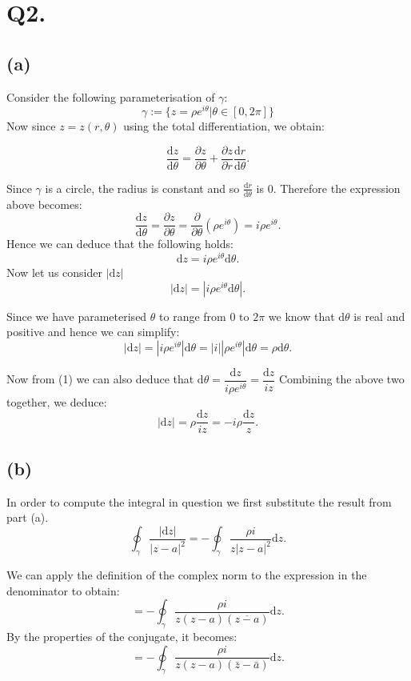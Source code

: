 \documentclass[12pt]{article}
\begin{document}
\section*{Q2.}
\subsection*{(a)}
Consider the following parameterisation of $\gamma$:
\[\gamma := \{ z=\rho e^{i\theta} | \theta \in [0, 2\pi] \}\]
Now since $ z = z(r, \theta) $ using the total differentiation, we obtain:

\[
	\frac{\text{d} z}{\text{d} \theta} = \frac{\partial z}{\partial \theta} + \frac{\partial z}{\partial r} \frac{\text{d} r}{\text{d} \theta}
.\]

Since $\gamma$ is a circle, the radius is constant and so $\frac{\text{d} r}{\text{d} \theta}$ is 0.
Therefore the expression above becomes:
\[
	\frac{\text{d} z}{\text{d} \theta} = \frac{\partial z}{\partial \theta}
	= \frac{\partial  }{\partial \theta} \left(\rho e^{i\theta}\right)
	= i\rho e^{i\theta}
.\]
Hence we can deduce that the following holds:
\begin{equation}
	\text{d}z = i\rho e^{i\theta} \text{d}\theta
.\end{equation}
Now let us consider $|\text{d}z|$
\[
	|\text{d}z| = |i\rho e^{i\theta} \text{d} \theta|
.\]

Since we have parameterised $\theta$ to range from $0 \text{ to } 2\pi$ we know that $\text{d} \theta$ is real and positive and hence we can simplify:
\[
|\text{d}z| = |i\rho e^{i\theta}|\text{d} \theta = |i| |\rho e^{i\theta}| \text{d}\theta = \rho \text{d}\theta
.\]

Now from (1) we can also deduce that $\text{d}\theta = \dfrac{\text{d}z}{i \rho e^{i\theta}} = \dfrac{\text{d}z}{iz}$
Combining the above two together, we deduce:
\[
|\text{d}z| = \rho \frac{\text{d}z}{iz} =  - i\rho \frac{\text{d}z}{z}
.\]

\subsection*{(b)}
In order to compute the integral in question we first substitute the result from part (a).
\[
	\oint_\gamma \frac{|\text{d}z|}{|z - a|^2} = - \oint_\gamma \frac{\rho i}{z |z - a|^2} \text{d} z
.\]

We can apply the definition of the complex norm to the expression in the denominator to obtain:
\[
	= - \oint_\gamma \frac{\rho i}{z (z - a) (\overline{z - a})} \text{d} z
.\]
By the properties of the conjugate, it becomes:
\[
= - \oint_\gamma \frac{\rho i}{z (z - a) (\bar{z} - \bar{a})} \text{d} z
.\]
\end{document}
